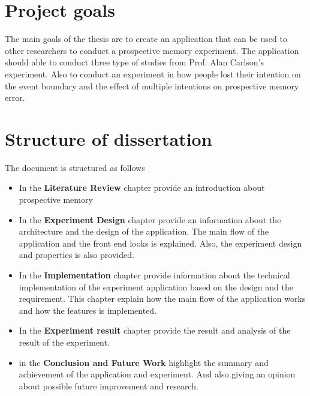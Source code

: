 \section{Project goals}
The main goals of the thesis are to create an application that can be used to other researchers to conduct a prospective memory experiment. The application should able to conduct three type of studies from Prof. Alan Carlson's experiment.
Also to conduct an experiment in how people lost their intention on the event boundary and the effect of multiple intentions on prospective memory error.

\section{Structure of dissertation}

The document is structured as follows
\begin{itemize}
\item In the \textbf{Literature Review} chapter provide an introduction about prospective memory

\item In the \textbf{Experiment Design} chapter provide an information about the architecture and the design of the application. The main flow of the application and the front end looks is explained. Also, the experiment design and properties is also provided.

\item In the \textbf{Implementation} chapter provide information about the technical implementation of the experiment application based on the design and the requirement. This chapter explain how the main flow of the application works and how the features is implemented.

\item In the \textbf{Experiment result} chapter provide the result and analysis of the result of the experiment.

\item in the \textbf{Conclusion and Future Work} highlight the summary and achievement of the application and experiment. And also giving an opinion about possible future improvement and research.


\end{itemize}
